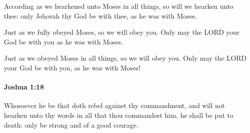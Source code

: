 			\begin{versebox}
					\item[BHS] 
					\item[ASV] According as we hearkened unto Moses in all things, so will we hearken unto thee: only Jehovah thy God be with thee, as he was with Moses.
					\item[NIV] Just as we fully obeyed Moses, so we will obey you. Only may the LORD your God be with you as he was with Moses.
					\item[NRSV] Just as we obeyed Moses in all things, so we will obey you. Only may the LORD your God be with you, as he was with Moses!
			\end{versebox}

		\paragraph{Joshua 1:18} %
			\label{JOSHUA-1-18}

			Whosoever he be that doth rebel against thy commandment, and will not hearken unto thy words in all that thou commandest him, he shall be put to death: only be strong and of a good courage.

